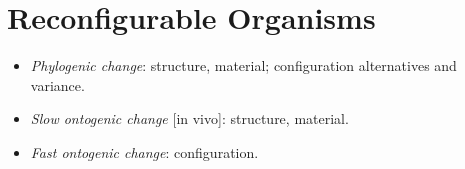 





\section{Reconfigurable Organisms}


\begin{itemize}
    \item \textit{Phylogenic change}: structure, material; configuration alternatives and variance.
    \item \textit{Slow ontogenic change} [in vivo]: structure, material.
    \item \textit{Fast ontogenic change}: configuration.
\end{itemize}



